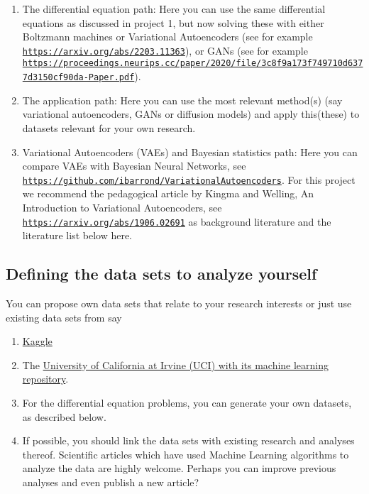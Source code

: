 \documentclass[%
oneside,                 %
final,                   %
10pt]{article}
\begin{document}
\begin{enumerate}
\item The differential equation path: Here you can use the same differential equations as discussed in project 1, but now solving these with either Boltzmann machines or Variational Autoencoders (see for example \href{{https://arxiv.org/abs/2203.11363}}{\nolinkurl{https://arxiv.org/abs/2203.11363}}), or GANs (see for example \href{{https://proceedings.neurips.cc/paper/2020/file/3c8f9a173f749710d6377d3150cf90da-Paper.pdf}}{\nolinkurl{https://proceedings.neurips.cc/paper/2020/file/3c8f9a173f749710d6377d3150cf90da-Paper.pdf}}).  

\item The application path: Here you can use the most relevant method(s) (say variational autoencoders, GANs or diffusion models) and apply this(these) to datasets relevant for your own research.

\item Variational Autoencoders (VAEs) and Bayesian statistics path: Here you can compare VAEs with Bayesian Neural Networks, see \href{{https://github.com/ibarrond/VariationalAutoencoders}}{\nolinkurl{https://github.com/ibarrond/VariationalAutoencoders}}. For this project we recommend the pedagogical article by Kingma and Welling, An Introduction to Variational Autoencoders, see \href{{https://arxiv.org/abs/1906.02691}}{\nolinkurl{https://arxiv.org/abs/1906.02691}} as background literature and the literature list below here.
\end{enumerate}

\noindent
\subsection{Defining the data sets to analyze yourself}

You can propose own data sets that relate to your research interests or just use existing data sets from say
\begin{enumerate}
\item \href{{https://www.kaggle.com/datasets}}{Kaggle} 

\item The \href{{https://archive.ics.uci.edu/ml/index.php}}{University of California at Irvine (UCI) with its  machine learning repository}.

\item For the differential equation problems, you can generate your own datasets, as described below.

\item If possible, you should link the data sets with existing research and analyses thereof. Scientific articles which have used Machine Learning algorithms to analyze the data are highly welcome. Perhaps you can improve previous analyses and even publish a new article? 
\end{enumerate}
\end{document}
